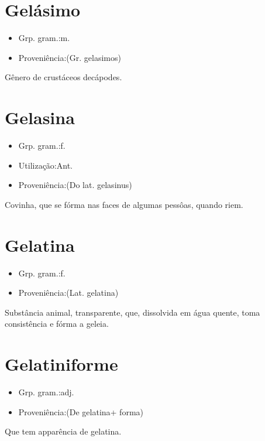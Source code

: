 \section{Gelásimo}
\begin{itemize}
\item {Grp. gram.:m.}
\end{itemize}
\begin{itemize}
\item {Proveniência:(Gr. \textunderscore gelasimos\textunderscore )}
\end{itemize}
Gênero de crustáceos decápodes.
\section{Gelasina}
\begin{itemize}
\item {Grp. gram.:f.}
\end{itemize}
\begin{itemize}
\item {Utilização:Ant.}
\end{itemize}
\begin{itemize}
\item {Proveniência:(Do lat. \textunderscore gelasinus\textunderscore )}
\end{itemize}
Covinha, que se fórma nas faces de algumas pessôas, quando riem.
\section{Gelatina}
\begin{itemize}
\item {Grp. gram.:f.}
\end{itemize}
\begin{itemize}
\item {Proveniência:(Lat. \textunderscore gelatina\textunderscore )}
\end{itemize}
Substância animal, transparente, que, dissolvida em água quente, toma consistência e fórma a geleia.
\section{Gelatiniforme}
\begin{itemize}
\item {Grp. gram.:adj.}
\end{itemize}
\begin{itemize}
\item {Proveniência:(De \textunderscore gelatina\textunderscore  + \textunderscore forma\textunderscore )}
\end{itemize}
Que tem apparência de gelatina.
